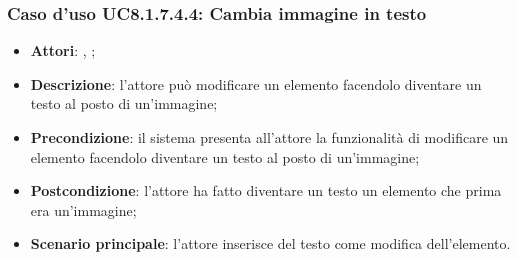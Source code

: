		\subsubsection{Caso d'uso UC8.1.7.4.4: Cambia immagine in testo}
		\begin{itemize}
			\item \textbf{Attori}: \uau, \uaupro;
			\item \textbf{Descrizione}: l'attore può modificare un elemento facendolo diventare un testo al posto di un'immagine;
			\item \textbf{Precondizione}: il sistema presenta all'attore la funzionalità di modificare un elemento facendolo diventare un testo al posto di un'immagine;
			\item \textbf{Postcondizione}: l'attore ha fatto diventare un testo un elemento che prima era un'immagine;
			\item \textbf{Scenario principale}: l'attore inserisce del testo come modifica dell'elemento.  
		\end{itemize}
		
